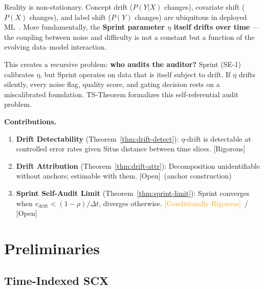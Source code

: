 \documentclass[12pt,a4paper]{article}
\newcommand{\rigorous}{\textcolor{green!50!black}{\small\textsf{[Rigorous]}}}
\newcommand{\conditionallyrigorous}{\textcolor{orange}{\small\textsf{[Conditionally Rigorous]}}}
\newcommand{\openquest}{\textcolor{red!70!black}{\small\textsf{[Open]}}}
\begin{document}
Reality is non-stationary.  Concept drift ($P(Y|X)$ changes), covariate
shift ($P(X)$ changes), and label shift ($P(Y)$ changes) are ubiquitous in
deployed ML~\citep{gama2014survey, lu2018learning}.  More fundamentally,
the \textbf{Sprint parameter $\eta$ itself drifts over time} — the coupling
between noise and difficulty is not a constant but a function of the
evolving data--model interaction.

This creates a recursive problem: \textbf{who audits the auditor?}  Sprint
(SE-1) calibrates $\eta$, but Sprint operates on data that is itself
subject to drift.  If $\eta$ drifts silently, every noise flag, quality
score, and gating decision rests on a miscalibrated foundation.  TS-Theorem
formalizes this self-referential audit problem.

\medskip\noindent
\textbf{Contributions.}
\begin{enumerate}[label=(\arabic*)]
    \item \textbf{Drift Detectability} (Theorem~\ref{thm:drift-detect}):
          $\eta$-drift is detectable at controlled error rates given Situs
          distance between time slices.  \rigorous
    \item \textbf{Drift Attribution} (Theorem~\ref{thm:drift-attr}):
          Decomposition unidentifiable without anchors; estimable with them.
          \openquest~(anchor construction)
    \item \textbf{Sprint Self-Audit Limit} (Theorem~\ref{thm:sprint-limit}):
          Sprint converges when $v_{\mathrm{drift}} < (1-\rho)/\Delta t$,
          diverges otherwise.  \conditionallyrigorous~/ \openquest
\end{enumerate}

\section{Preliminaries}

\subsection{Time-Indexed SCX}
\end{document}
